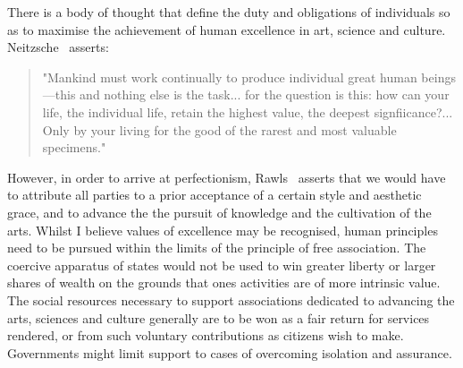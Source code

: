 \documentclass[11pt, oneside]{article}   	%
\begin{document}
There is a body of thought that define the duty and obligations of individuals so as to maximise the achievement of human excellence in art, science and culture. Neitzsche~\cite{gam1} asserts:
\begin{quote}
"Mankind must work continually to produce individual great human beings---this and nothing else is the task... for the question is this: how can your life, the individual life, retain the highest value, the deepest signfiicance?... Only by your living for the good of the rarest and most valuable specimens."
\end{quote}
However, in order to arrive at perfectionism, Rawls~\cite{jr1} asserts that we would have to attribute all parties to a prior acceptance of a certain style and aesthetic grace, and to advance the the pursuit of knowledge and the cultivation of the arts.
Whilst I believe values of excellence may be recognised, human principles need to be pursued within the limits of the principle of free association.
The coercive apparatus of states would not be used to win greater liberty or larger shares of wealth on the grounds that ones activities are of more intrinsic value.
The social resources necessary to support associations dedicated to advancing the arts, sciences and culture generally are to be won as a fair return for services rendered, or from such voluntary contributions as citizens wish to make.
Governments might limit support to cases of overcoming isolation and assurance.
\end{document}
